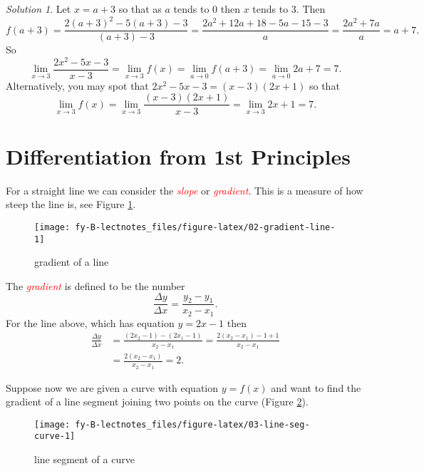 \documentclass[
  11pt,
  oneside]{book}
\newcommand{\slide}{}
\theoremstyle{definition}
\theoremstyle{definition}
\theoremstyle{definition}
\theoremstyle{definition}
\theoremstyle{remark}
\newtheorem*{solution}{Solution}
\begin{document}
\begin{solution}
Let \(x = a+3\) so that as \(a\) tends to \(0\) then \(x\) tends to \(3\). Then
\[
f(a+3) = \frac{2(a+3)^2-5(a+3)-3}{(a+3)-3}=\frac{2a^2+12a+18-5a-15-3}{a}=\frac{2a^2+7a}{a} = a+7.
\]
So
\[
\lim\limits_{x\to3}\frac{2x^2-5x-3}{x-3} = \lim\limits_{x\to3}f(x) = \lim\limits_{a\to0}f(a+3) = \lim\limits_{a\to0}2a+7 = 7.
\]
Alternatively, you may spot that \(2x^2-5x-3 = (x-3)(2x+1)\) so that
\[
\lim\limits_{x\to 3}f(x) = \lim\limits_{x\to3}\frac{(x-3)(2x+1)}{x-3} = \lim\limits_{x\to3}2x+1 = 7.
\]
\end{solution}

\slide

\section{Differentiation from 1st Principles}\label{lecture-two}

For a straight line we can consider the \textcolor{red}{\em slope} or \textcolor{red}{\em gradient}. This is a measure of how steep the line is, see Figure \ref{fig:02-gradient-line}.

\begin{figure}

{\centering \texttt{[image: fy-B-lectnotes\_files/figure-latex/02-gradient-line-1]} 

}

\caption{gradient of a line}\label{fig:02-gradient-line}
\end{figure}

\slide

The \textcolor{red}{\em gradient} is defined to be the number
\[
\frac{\Delta y}{\Delta x} = \frac{y_2-y_1}{x_2-x_1}.
\]
For the line above, which has equation \(y = 2x-1\) then
\begin{align*}
\frac{\Delta y}{\Delta x} &= \frac{(2x_2-1)-(2x_1-1)}{x_2-x_1} = \frac{2(x_2-x_1)-1+1}{x_2-x_1}\\ &= \frac{2(x_2-x_1)}{x_2-x_1} = 2.
\end{align*}

\slide

Suppose now we are given a curve with equation \(y=f(x)\) and want to find the gradient of a line segment joining two points on the curve (Figure \ref{fig:03-line-seg-curve}).

\begin{figure}

{\centering \texttt{[image: fy-B-lectnotes\_files/figure-latex/03-line-seg-curve-1]} 

}

\caption{line segment of a curve}\label{fig:03-line-seg-curve}
\end{figure}
\end{document}
